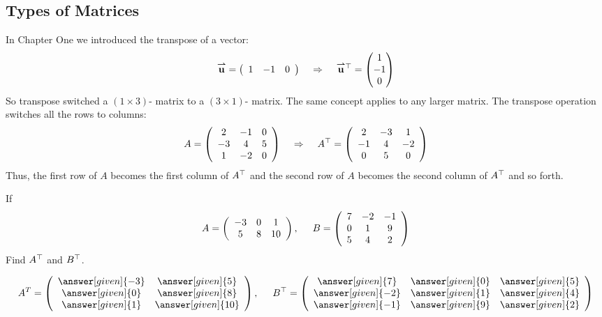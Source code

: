 \documentclass{ximera}
\begin{document}
\subsection{Types of Matrices}
In Chapter One we introduced the transpose of a vector:
\[
{\overset{\boldsymbol{\rightharpoonup}}{\mathbf{u}}}\hspace{0in} = \left(\begin{array}{ccc}
1 & -1 & 0
\end{array}\right)
\hspace{.4cm}\Rightarrow\hspace{.4cm}
{\overset{\boldsymbol{\rightharpoonup}}{\mathbf{u}}}\hspace{0in}^{\top} = \begin{pmatrix}
1\\
-1\\
0
\end{pmatrix}
\]
So transpose switched a $\left(1\times 3\right)$- matrix to a $\left(3\times 1\right)$- matrix. The same concept applies to any larger matrix. The transpose operation switches all the rows to columns:
\[
A = \left(\begin{array}{ccc}
2 & -1 & 0\\
-3 & 4 & 5\\
1 & -2 & 0
\end{array}\right)
\hspace{.4cm}\Rightarrow\hspace{.4cm}
A^{\top} = \left(\begin{array}{ccc}
2 & -3 & 1\\
-1 & 4 & -2\\
0& 5 & 0
\end{array}\right)
\]
Thus, the first row of $A$ becomes the first column of $A^{\top}$ and the second row of $A$ becomes the second column of $A^{\top}$ and so forth.
\begin{question}
If
\[A= \left(\begin{array}{ccc}
-3 & 0 & 1\\
5 & 8 & 10
\end{array}\right), \hspace{.5cm} B = \left(\begin{array}{ccc}
7 & -2 & -1 \\
0 & 1 & 9 \\
5 & 4 & 2
\end{array}\right)\]
Find $A^{\top}$ and $B^{\top}$.

\begin{prompt}
\[A^{T} = \left(\begin{array}{cc}
\answer[given]{-3} & \answer[given]{5}\\
\answer[given]{0} & \answer[given]{8}\\
\answer[given]{1} & \answer[given]{10}
\end{array}\right), \hspace{.5cm} B^{\transpose}= \left(\begin{array}{ccc}
\answer[given]{7} & \answer[given]{0} & \answer[given]{5}\\
\answer[given]{-2} & \answer[given]{1} & \answer[given]{4}\\
\answer[given]{-1} & \answer[given]{9} & \answer[given]{2}
\end{array}\right)\]
\end{prompt}
\end{question}
\end{document}
